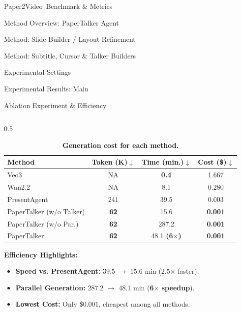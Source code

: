 \documentclass{beamer}
\newcommand{\alertterm}[1]{\alert{\textbf{#1}}}
\newcommand{\bench}{Paper2Video}
\begin{document}
\begin{frame}{\bench~Benchmark \& Metrics}
\begin{frame}{Method Overview: PaperTalker Agent}
\begin{frame}{Method: Slide Builder / Layout Refinement}
\begin{frame}{Method: Subtitle, Cursor \& Talker Builders}
\begin{frame}{Experimental Settings}
\begin{frame}{Experimental Results: Main}
\begin{frame}{Ablation Experiment \& Efficiency}
  \begin{columns}[T] %
    \begin{column}{0.5\textwidth}
      \begin{table} %
        \centering
        \small
        \setlength{\tabcolsep}{3pt}
        \caption{\textbf{Generation cost for each method.}}
        \label{table:cost_exp}
        \begin{tabular}{lccc}
          \toprule
          Method & Token (K)$\downarrow$ & Time (min.)$\downarrow$ & Cost (\$)$\downarrow$ \\
          \midrule
          Veo3~\cite{deepmind2025veo3} & NA & \textbf{0.4} & 1.667 \\
          Wan2.2~\cite{wan} & NA & 8.1 & 0.280 \\
          \midrule
          PresentAgent~\cite{shi2025pptagent} & 241 & 39.5 & 0.003  \\
          PaperTalker (w/o Talker) & \textbf{62} & 15.6 & \textbf{0.001}\\
          \midrule
          PaperTalker (w/o Par.) & \textbf{62} & 287.2 & \textbf{0.001}\\
          PaperTalker & \textbf{62} & 48.1 \textbf{(\alertterm{6$\times$})} & \textbf{0.001} \\
          \bottomrule
        \end{tabular}
      \end{table}
      \vspace{-0.3\baselineskip}
      \textbf{Efficiency Highlights:}
      \begin{itemize}
        \item \textbf{Speed vs. PresentAgent:} 39.5 $\rightarrow$ 15.6 min (2.5$\times$ faster).
        \item \textbf{Parallel Generation:} 287.2 $\rightarrow$ 48.1 min (\textbf{6$\times$ speedup}).
        \item \textbf{Lowest Cost:} Only \$0.001, cheapest among all methods.
      \end{itemize}
    \end{column}


\end{columns}
\end{frame}
\end{frame}
\end{frame}
\end{frame}
\end{frame}
\end{frame}
\end{frame}
\end{document}
